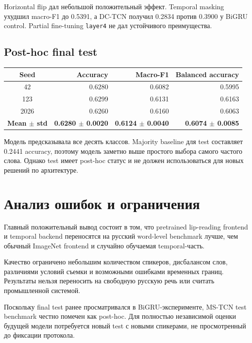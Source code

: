 \documentclass[12pt,a4paper]{article}
\begin{document}
Horizontal flip дал небольшой положительный эффект. Temporal masking ухудшил
macro-F1 до 0.5391, а DC-TCN получил 0.2834 против 0.3900 у BiGRU control.
Partial fine-tuning \texttt{layer4} не дал устойчивого преимущества.

\subsection{Post-hoc final test}

\begin{table}[htbp]
\centering
\begin{tabular}{crrr}
\toprule
Seed & Accuracy & Macro-F1 & Balanced accuracy \\
\midrule
42 & 0.6280 & 0.6082 & 0.5995 \\
123 & 0.6299 & 0.6131 & 0.6163 \\
2026 & 0.6260 & 0.6160 & 0.6063 \\
\textbf{Mean $\pm$ std} & \textbf{0.6280 $\pm$ 0.0020} & \textbf{0.6124 $\pm$ 0.0040} & \textbf{0.6074 $\pm$ 0.0085} \\
\bottomrule
\end{tabular}
\end{table}

Модель предсказывала все десять классов. Majority baseline для test
составляет 0.2441 accuracy, поэтому модель заметно выше простого выбора
самого частого слова. Однако test имеет post-hoc статус и не должен
использоваться для новых решений по архитектуре.

\section{Анализ ошибок и ограничения}

Главный положительный вывод состоит в том, что pretrained lip-reading
frontend и temporal backend переносятся на русский word-level benchmark
лучше, чем обычный ImageNet frontend и случайно обучаемая temporal-часть.

Качество ограничено небольшим количеством спикеров, дисбалансом слов,
различиями условий съемки и возможными ошибками временных границ. Результаты
нельзя переносить на свободную русскую речь или считать промышленной системой.

Поскольку final test ранее просматривался в BiGRU-эксперименте, MS-TCN test
benchmark честно помечен как post-hoc. Для полностью независимой оценки
будущей модели потребуется новый test с новыми спикерами, не просмотренный
до фиксации протокола.
\end{document}
